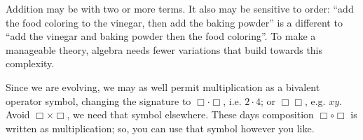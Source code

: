 Addition  may be with two or more terms.  It also may be 
sensitive to order: ``add the food coloring to the vinegar, then add the baking
powder'' is a different to ``add the vinegar and baking powder then the
food coloring''.  To make a manageable theory, algebra needs fewer variations that 
build towards this complexity.

Since we are evolving, we may as well permit multiplication as a bivalent operator
symbol, changing the signature to $\Box \cdot \Box$, i.e. $2\cdot 4$; or
$\Box\Box$, e.g. $xy$.   Avoid $\Box\times \Box$, we need that symbol elsewhere.
These days composition $\Box\circ\Box$ is written as multiplication; so, you can
use that symbol however you like.  
